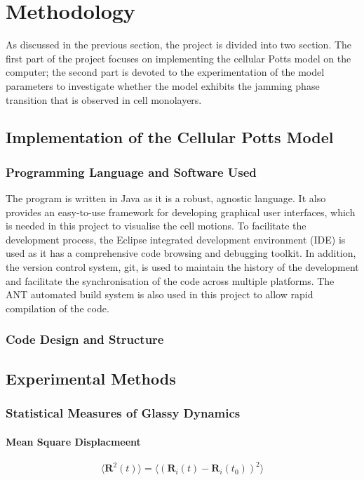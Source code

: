 \documentclass[a4paper,12pt]{article}
\renewcommand{\vec}[1]{\mathbf{#1}}
\begin{document}
\section{Methodology}
As discussed in the previous section, the project is divided into two section. The first part of the project focuses on implementing the cellular Potts model on the computer; the second part is devoted to the experimentation of the model parameters to investigate whether the model exhibits the jamming phase transition that is observed in cell monolayers.

\subsection{Implementation of the Cellular Potts Model}
\subsubsection{Programming Language and Software Used}
The program is written in Java as it is a robust, agnostic language. It also provides an easy-to-use framework for developing graphical user interfaces, which is needed in this project to visualise the cell motions. To facilitate the development process, the Eclipse integrated development environment (IDE) is used as it has a comprehensive code browsing and debugging toolkit. In addition, the version control system, git, is used to maintain the history of the development and facilitate the synchronisation of the code across multiple platforms. The ANT automated build system is also used in this project to allow rapid compilation of the code.

\subsubsection{Code Design and Structure}

\subsection{Experimental Methods}
\subsubsection{Statistical Measures of Glassy Dynamics}
\paragraph{Mean Square Displacmeent}

\begin{equation}
\langle{\vec{R}^2(t)\rangle} = \langle{\left(\vec{R}_i(t) - \vec{R}_i(t_0)\right)^2\rangle}
\end{equation}
\end{document}
